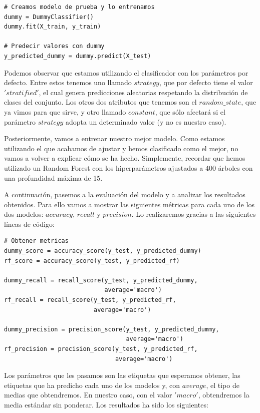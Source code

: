 \documentclass[11pt,a4paper]{article}
\begin{document}
\begin{lstlisting}
# Creamos modelo de prueba y lo entrenamos
dummy = DummyClassifier()
dummy.fit(X_train, y_train)

# Predecir valores con dummy
y_predicted_dummy = dummy.predict(X_test)
\end{lstlisting}

Podemos observar que estamos utilizando el clasificador con los parámetros por defecto. Entre estos tenemos uno llamado $strategy$, que por defecto tiene el valor $'stratified'$, el cual genera predicciones aleatorias respetando la distribución de clases del conjunto. Los otros dos atributos que tenemos son el $random\_state$, que ya vimos para que sirve, y otro llamado $constant$, que sólo afectará si el parámetro $strategy$ adopta un determinado valor (y no es nuestro caso).

Posteriormente, vamos a entrenar nuestro mejor modelo. Como estamos utilizando el que acabamos de ajustar y hemos clasificado como el mejor, no vamos a volver a explicar cómo se ha hecho. Simplemente, recordar que hemos utilizado un Random Forest con los hiperparámetros ajustados a 400 árboles con una profundidad máxima de 15.

A continuación, pasemos a la evaluación del modelo y a analizar los resultados obtenidos. Para ello vamos a mostrar las siguientes métricas para cada uno de los dos modelos: $accuracy$, $recall$ y $precision$. Lo realizaremos gracias a las siguientes líneas de código:

\begin{lstlisting}
# Obtener metricas
dummy_score = accuracy_score(y_test, y_predicted_dummy)
rf_score = accuracy_score(y_test, y_predicted_rf)

dummy_recall = recall_score(y_test, y_predicted_dummy,
                            average='macro')
rf_recall = recall_score(y_test, y_predicted_rf,
                         average='macro')

dummy_precision = precision_score(y_test, y_predicted_dummy,
                                  average='macro')
rf_precision = precision_score(y_test, y_predicted_rf,
                               average='macro')
\end{lstlisting}

Los parámetros que les pasamos son las etiquetas que esperamos obtener, las etiquetas que ha predicho cada uno de los modelos y, con $average$, el tipo de medias que obtendremos. En nuestro caso, con el valor $'macro'$, obtendremos la media estándar sin ponderar. Los resultados ha sido los siguientes:
\end{document}
